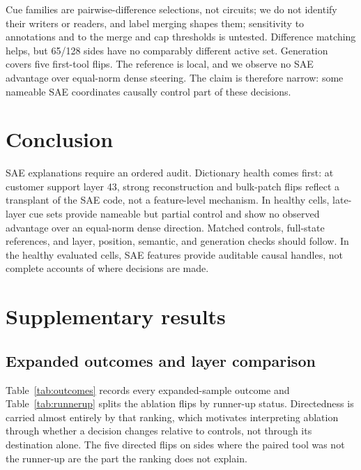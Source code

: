 \documentclass{article}
\begin{document}
Cue families are pairwise-difference selections, not circuits; we do not
identify their writers or readers, and label merging shapes them;
sensitivity to annotations and to the merge and cap thresholds is untested. Difference matching helps, but 65/128 sides
have no comparably different active set. Generation covers five first-tool
flips. The reference is local, and we observe no SAE advantage over
equal-norm dense steering. The claim is therefore narrow: some nameable SAE coordinates
causally control part of these decisions.

\section{Conclusion}

SAE explanations require an ordered audit. Dictionary health comes first: at
customer support layer 43, strong reconstruction and bulk-patch flips reflect a
transplant of the SAE code, not a feature-level mechanism. In healthy cells,
late-layer cue sets provide nameable but partial control and show no observed
advantage over an equal-norm dense direction. Matched controls, full-state
references, and layer, position, semantic, and generation checks should
follow. In the healthy evaluated cells, SAE features provide auditable causal
handles, not complete accounts of where decisions are made.

\clearpage



\clearpage
\appendix

\section{Supplementary results}

\subsection{Expanded outcomes and layer comparison}

Table~\ref{tab:outcomes} records every expanded-sample outcome and
Table~\ref{tab:runnerup} splits the ablation flips by runner-up status.
Directedness is carried almost entirely by that ranking, which motivates
interpreting ablation through whether a decision changes relative to controls,
not through its destination alone. The five directed flips on sides where the
paired tool was not the runner-up are the part the ranking does not explain.
\end{document}
